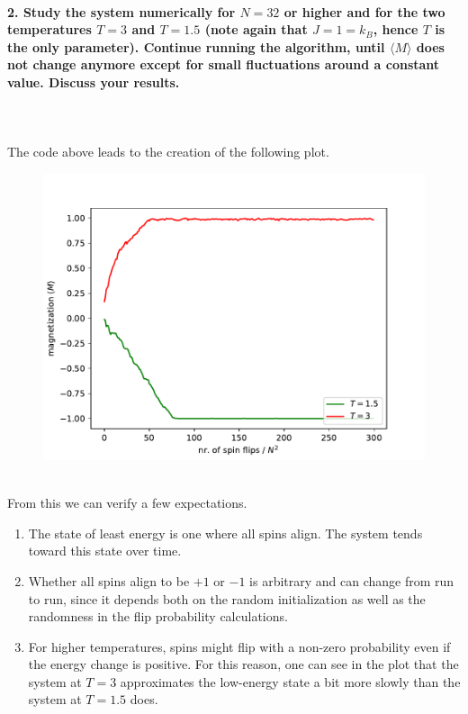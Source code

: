 \paragraph{2. Study the system numerically for $N=32$ or 
    higher and for the two temperatures $T=3$ and $T=1.5$ 
    (note again that $J=1=k_B$, hence $T$ is the only 
    parameter). Continue running the algorithm, until 
    $\langle M\rangle$ does not change anymore except for 
    small fluctuations around a constant value. Discuss 
    your results.
} \ \\
    \\
    The code above leads to the creation of the following
    plot.
    \begin{figure}[h!]
        \centering
        \includegraphics[width=.7\textwidth]{./figures/magnetization_vs_time.pdf}
    \end{figure} \ \\ 
    From this we can verify a few expectations.
    \begin{enumerate}
        \item The state of least energy is one where all 
            spins align. The system tends toward
            this state over time. 
        \item Whether all spins align to be $+1$ or $-1$ 
            is arbitrary and can change from run to run,
            since it depends both on the random 
            initialization as well as the randomness 
            in the flip probability calculations.
        \item For higher temperatures, spins might flip 
            with a non-zero probability even if the 
            energy change is positive. For this reason, 
            one can see in the plot that the system at 
            $T=3$ approximates the low-energy state a bit
            more slowly than the system at $T=1.5$ does.
    \end{enumerate}
    
